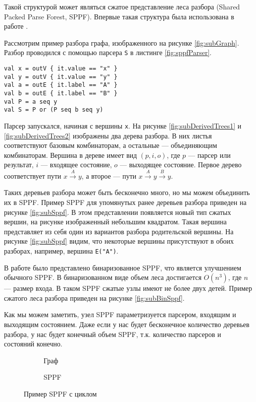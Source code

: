 Такой структурой может являться сжатое представление леса разбора (Shared Packed Parse Forest, SPPF). Впервые такая структура была использована в работе \cite{RekersSppf}.

Рассмотрим пример разбора графа, изображенного на рисунке \ref{fig:subGraph}. Разбор проводился с помощью парсера \texttt{S} в листинге \ref{fig:sppfParser}.

\begin{lstlisting}[float=h, label=fig:sppfParser, caption=Пример парсера для разбора графа]
val x = outV { it.value == "x" }
val y = outV { it.value == "y" }
val a = outE { it.label == "A" }
val b = outE { it.label == "B" }
val P = a seq y
val S = P or (P seq b seq y)
\end{lstlisting}

Парсер запускался, начиная с вершины \texttt{x}. На рисунке \ref{fig:subDerivedTrees1} и \ref{fig:subDerivedTrees2} изображены два дерева разбора. В них листья соответствуют базовым комбинаторам, а остальные --- объединяющим комбинаторам. Вершина в дереве имеет вид $(p, i, o)$, где $p$ --- парсер или результат, $i$ --- входящее состояние, $o$ --- выходящее состояние. Первое дерево соответствует пути $x \xrightarrow{A} y$, а второе --- пути $x \xrightarrow{A} y \xrightarrow{B} y$.

Таких деревьев разбора может быть бесконечно много, но мы можем объединить их в SPPF. Пример SPPF для упомянутых ранее деревьев разбора приведен на рисунке \ref{fig:subSppf}. В этом представлении появляется новый тип сжатых вершин, на рисунке изображенный небольшим квадратом. Такая вершина представляет из себя один из вариантов разбора родительской вершины. На рисунке \ref{fig:subSppf} видим, что некоторые вершины присутствуют в обоих разборах, например, вершина \texttt{E("A")}.

В работе \cite{BinSppf} было представлено бинаризованное SPPF, что является улучшением обычного SPPF. В бинаризованном виде объем леса достигается $O(n^3)$, где $n$ --- размер входа. В таком SPPF сжатые узлы имеют не более двух детей. Пример сжатого леса разбора приведен на рисунке \ref{fig:subBinSppf}.

Как мы можем заметить, узел SPPF параметризуется парсером, входящим и выходящим состоянием. Даже если у нас будет бесконечное количество деревьев разбора, у нас будет конечный объем SPPF, т.к. количество парсеров и состояний конечно.

\begin{figure}[htp]
    \centering
    \begin{subfigure}[b]{0.3\textwidth}
        \centering
        
        \caption{Граф}
        \label{fig:subLoopGr}
    \end{subfigure}
    \hfill
    \begin{subfigure}[b]{0.5\textwidth}
        \centering
        
        \caption{SPPF}
        \label{fig:subLoopSppf}
    \end{subfigure}

    \caption{Пример SPPF с циклом}
    \label{fig:sppf}
\end{figure}

